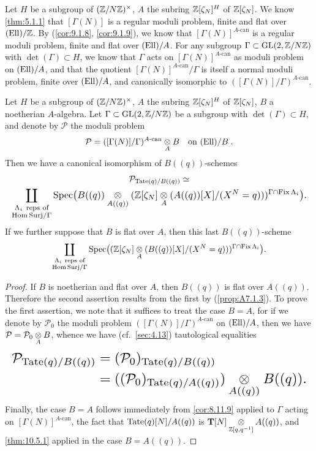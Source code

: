 \kmitem\label{item:10.8.1}
Let $H$ be a subgroup of $(\mathbb{Z}/N\mathbb{Z})^\times$, $A$ the subring $\mathbb{Z}[\zeta_N]^H$ of $\mathbb{Z}[\zeta_N]$. We know \eqref{thm:5.1.1} that $[\Gamma(N)]$ is a regular moduli problem, finite and flat over $(\mathrm{Ell})/\mathbb{Z}$. By (\ref{cor:9.1.8}, \ref{cor:9.1.9}), we know that $[\Gamma(N)]^{A\text{-can}}$ is a regular moduli problem, finite and flat over $(\mathrm{Ell})/A$. For any subgroup $\Gamma \subset \operatorname{GL}(2,\mathbb{Z}/N\mathbb{Z})$ with $\det(\Gamma) \subset H$, we know that $\Gamma$ acts on $[\Gamma(N)]^{A\text{-can}}$ as moduli problem on $(\mathrm{Ell})/A$, and that the quotient $[\Gamma(N)]^{A\text{-can}}/\Gamma$ is itself a normal moduli problem, finite over $(\mathrm{Ell})/A$, and canonically isomorphic to $([\Gamma(N)]/\Gamma)^{A\text{-can}}$.

\begin{kthm}\label{thm:10.8.2}
Let $H$ be a subgroup of $(\mathbb{Z}/N\mathbb{Z})^\times$, $A$ the subring $\mathbb{Z}[\zeta_N]^H$ of $\mathbb{Z}[\zeta_N]$, $B$ a noetherian $A$-algebra. Let $\Gamma \subset \operatorname{GL}(2,\mathbb{Z}/N\mathbb{Z})$ be a subgroup with $\det(\Gamma) \subset H$, and denote by $\mathcal{P}$ the moduli problem
\[
\mathcal{P} = ([\Gamma(N)]/\Gamma)^{A\text{-can}} \underset{A}{\otimes} B \quad\text{on } (\mathrm{Ell})/B \; .
\]
Then we have a canonical isomorphism of $B((q))$-schemes
\begin{gather*}
\mathcal{P}_{\Tate(q)/B((q))} \simeq \\
\resizebox{\linewidth}{!}{$\displaystyle
\coprod_{\substack{\Lambda_i\ \text{reps of}\\ \HomSurj/\Gamma}}
\Spec\bigl(B((q)) \tens{A((q))} (\Z[\zeta_N] \tens{A} (A((q))[X]/(X^N = q)))^{\Gamma \cap \Fix \Lambda_i}\bigr) .
$}
\end{gather*}
If we further suppose that $B$ is flat over $A$, then this last $B((q))$-scheme
\begin{gather*}
\coprod_{\substack{\Lambda_i\ \text{reps of}\\ \mathrm{Hom\,Surj}/\Gamma}}
\operatorname{Spec}\bigl((\mathbb{Z}[\zeta_N] \underset{A}{\otimes} (B((q))[X]/(X^N = q)))^{\Gamma \cap \operatorname{Fix} \Lambda_i}\bigr) .
\end{gather*}
\end{kthm}

\begin{proof}
If $B$ is noetherian and flat over $A$, then $B((q))$ is flat over $A((q))$. Therefore the second assertion results from the first by (\ref{prop:A7.1.3}). To prove the first assertion, we note that it suffices to treat the case $B = A$, for if we denote by $\mathcal{P}_0$ the moduli problem $([\Gamma(N)]/\Gamma)^{A\text{-can}}$ on $(\mathrm{Ell})/A$, then we have $\mathcal{P} = \mathcal{P}_0 \underset{A}{\otimes} B$, whence we have (cf.~\ref{sec:4.13}) tautological equalities
\[
\resizebox{\linewidth}{!}{$\displaystyle
\begin{aligned}
\mathcal{P}_{\Tate(q)/B((q))} &= (\mathcal{P}_0)_{\Tate(q)/B((q))} \\
&= ((\mathcal{P}_0)_{\Tate(q)/A((q))}) \tens{A((q))} B((q)) .
\end{aligned}
$}
\]
Finally, the case $B = A$ follows immediately from \eqref{cor:8.11.9} applied to $\Gamma$ acting on $[\Gamma(N)]^{A\text{-can}}$, the fact that $\mathrm{Tate}(q)[N]/A((q))$ is $\mathbf{T}[N] \underset{\mathbb{Z}[q,q^{-1}]}{\otimes} A((q))$, and \eqref{thm:10.5.1} applied in the case $B = A((q))$.
\end{proof}

